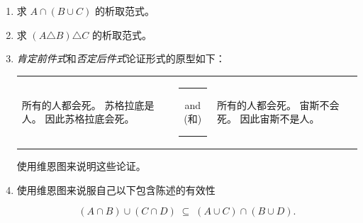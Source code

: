 \begin{enumerate}
    \wbvfill
    
    
    
    \item  
    求 $A \cap (B \cup C)$ 的析取范式。
    
    \wbvfill
    
    \workbookpagebreak
    
    \item  
    求 $(A \triangle B) \triangle C$ 的析取范式。
    
    
    \wbvfill
    
    \item 
    \emph{肯定前件式}和\emph{否定后件式}论证形式的原型如下：
    
    
    
    \begin{tabular}{lcl}
    \begin{minipage}{.3\textwidth}所有的人都会死。\newline %
    苏格拉底是人。\newline
    因此苏格拉底会死。\end{minipage} & \rule{16pt}{0pt} and (和) \rule{16pt}{0pt} & %
     \begin{minipage}{.3\textwidth}所有的人都会死。\newline %
    宙斯不会死。\newline
    因此宙斯不是人。\end{minipage}
    \end{tabular}
    
    
    使用维恩图来说明这些论证。
     
     \wbvfill
     
     \workbookpagebreak
     \hintspagebreak
    
    \item 
    使用维恩图来说服自己以下包含陈述的有效性
    
    \[ (A \cap B) \cup (C \cap D) \; \subseteq \; (A \cup C) \cap (B \cup D).\]
    

\end{enumerate}
